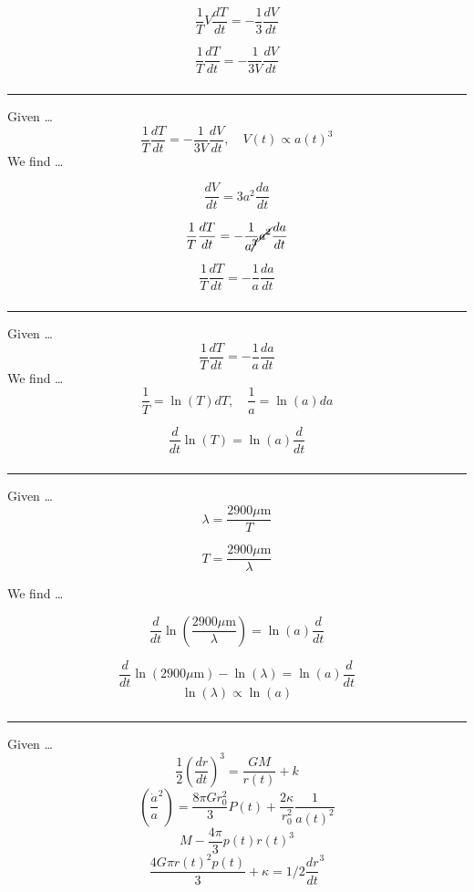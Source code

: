 \documentclass{article}
\begin{document}
\[\frac{1}{T}V\frac{dT}{dt} = -\frac{1}{3}\frac{dV}{dt}\]

\[\boxed{\frac{1}{T}\frac{dT}{dt} = -\frac{1}{3V}\frac{dV}{dt}}\]

\subsubsection{}
\hrule
\vspace{.5cm}

Given \dots 
\[\frac{1}{T}\frac{dT}{dt} = -\frac{1}{3V}\frac{dV}{dt}, \quad V(t) \propto a(t)^3\]
We find \dots 

\[\frac{dV}{dt} = 3a^2 \frac{ da}{dt}\]

\[\frac{1}{T}\frac{dT}{dt} = -\frac{1}{a\cancel{^3}}\cancel{a^2}\frac{da}{dt}\]

\[\boxed{\frac{1}{T}\frac{dT}{dt} = -\frac{1}{a}\frac{da}{dt}}\]

\subsubsection{}
\hrule
\vspace{.5cm}

Given \dots 
\[{\frac{1}{T}\frac{dT}{dt} = -\frac{1}{a}\frac{da}{dt}}\]
We find \dots
\[\frac{1}{T} =\ln(T)dT, \quad \frac{1}{a} =\ln(a)da\]

\[\boxed{\frac{d}{dt} \ln(T) = \ln(a)\frac{d}{dt}}\]

\subsubsection{}
\hrule
\vspace{.5cm}

Given \dots 
\[\lambda = \frac{2900 \mu \text{m}}{T}\]

\[T = \frac{2900 \mu \text{m}}{\lambda}\]

We find \dots 

\[{\frac{d}{dt} \ln\left(\frac{2900 \mu \text{m}}{\lambda}\right) = \ln(a)\frac{d}{dt}}\]

\[{\frac{d}{dt} \ln({2900 \mu \text{m}}) - \ln({\lambda}) = \ln(a)\frac{d}{dt}}\]
\[\boxed{\ln(\lambda) \propto \ln(a)}\]

\subsubsection{}
\hrule
\vspace{.5cm}
Given \dots 
\[\frac{1}{2} \left(\frac{dr}{dt}\right)^3 = \frac{GM}{r(t)} + k\]
\[\left(\frac{\dot{a}}{a}^2\right) = \frac{8\pi Gr_0^2}{3}P(t) + \frac{2\kappa}{r_0^2} \frac{1}{a(t)^2}\]
\[M- \frac{4\pi}{3} p(t) r(t)^3\]
\[\frac{4G\pi r(t)^2 p(t)}{3} + \kappa = 1/2 \frac{dr}{dt}^3\]
\end{document}
